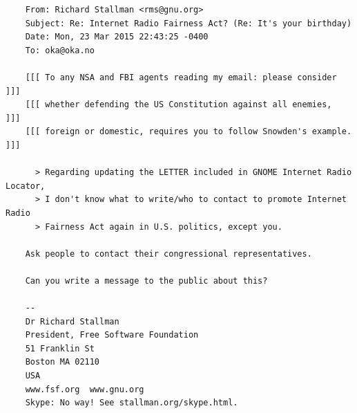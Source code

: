\documentclass[20pt,landscape]{foils}
\begin{document}

\begin{list1}
\item
  \begin{tiny}
\begin{verbatim}
    From: Richard Stallman <rms@gnu.org>
    Subject: Re: Internet Radio Fairness Act? (Re: It's your birthday)
    Date: Mon, 23 Mar 2015 22:43:25 -0400
    To: oka@oka.no

    [[[ To any NSA and FBI agents reading my email: please consider    ]]]
    [[[ whether defending the US Constitution against all enemies,     ]]]
    [[[ foreign or domestic, requires you to follow Snowden's example. ]]]

      > Regarding updating the LETTER included in GNOME Internet Radio Locator,
      > I don't know what to write/who to contact to promote Internet Radio
      > Fairness Act again in U.S. politics, except you.

    Ask people to contact their congressional representatives.

    Can you write a message to the public about this?

    -- 
    Dr Richard Stallman
    President, Free Software Foundation
    51 Franklin St
    Boston MA 02110
    USA
    www.fsf.org  www.gnu.org
    Skype: No way! See stallman.org/skype.html.
\end{verbatim}
  \end{tiny}
\end{list1}  

\end{document}
